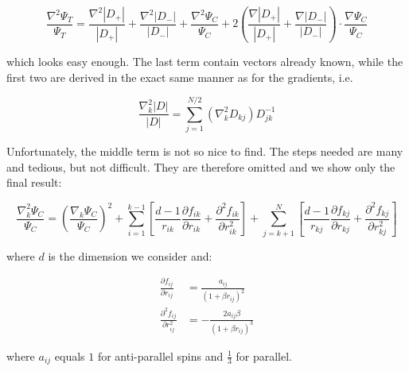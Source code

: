 \documentclass[english, a4paper]{article}
\begin{document}
	\begin{equation}
	\frac{\nabla^2\Psi_T}{\Psi_T} = \frac{\nabla^2 |D_+|}{|D_+|} + \frac{\nabla^2 |D_-|}{|D_-|} + \frac{\nabla^2 \Psi_C}{\Psi_C} + 2\left( \frac{\nabla |D_+|}{|D_+|} + \frac{\nabla |D_-|}{|D_-|} \right)\cdot\frac{\nabla \Psi_C}{\Psi_C}
	\end{equation}
	
	which looks easy enough. The last term contain vectors already known, while the first two are derived in the exact same manner as for the gradients, i.e.
	
	\begin{equation}
	\frac{\nabla_k^2|D|}{|D|} = \sum_{j=1}^{N/2}(\nabla_k^2D_{kj})D_{jk}^{-1}
	\end{equation}
	
	Unfortunately, the middle term is not so nice to find. The steps needed are many and tedious, but not difficult. They are therefore omitted and we show only the final result:
	
	\begin{equation}
	\frac{\nabla_k^2 \Psi_C}{\Psi_C} = \left(\frac{\nabla_k\Psi_C}{\Psi_C}\right)^2 + \sum_{i=1}^{k-1}\left[\frac{d-1}{r_{ik}}\frac{\partial f_{ik}}{\partial r_{ik}} + \frac{\partial^2 f_{ik}}{\partial r_{ik}^2}\right] + \sum_{j=k+1}^{N}\left[\frac{d-1}{r_{kj}}\frac{\partial f_{kj}}{\partial r_{kj}} + \frac{\partial^2 f_{kj}}{\partial r_{kj}^2}\right]
	\end{equation}
	
	where $d$ is the dimension we consider and:
	
	\begin{align}
	\frac{\partial f_{ij}}{\partial r_{ij}} &= \frac{a_{ij}}{(1+\beta r_{ij})^2}\\
	\frac{\partial^2 f_{ij}}{\partial r_{ij}^2} &= -\frac{2a_{ij}\beta}{(1+\beta r_{ij})^3}
	\end{align}
	
	where $a_{ij}$ equals $1$ for anti-parallel spins and $\frac{1}{3}$ for parallel.
	
	
\end{document}
